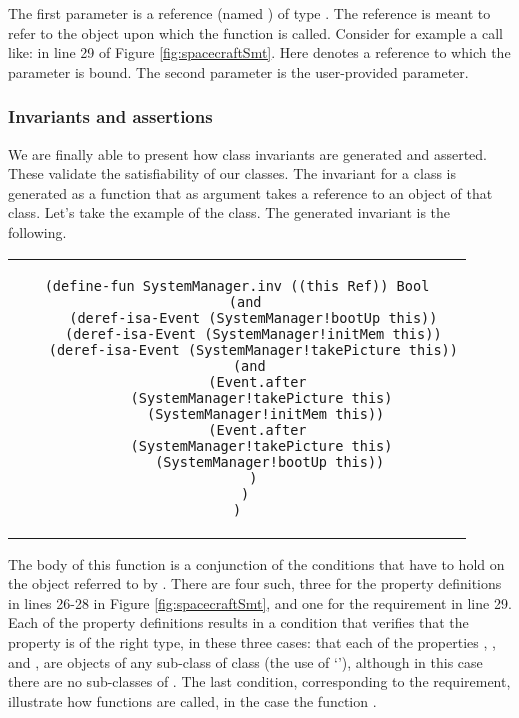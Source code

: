 The first parameter is a reference (named ) of type
. The  reference is meant to refer to the object
upon which the function is called. Consider for example a call like:
 in line 29 of Figure
\ref{fig:spacecraftSmt}. Here  denotes a reference
to which the parameter  is bound.  The second parameter is
the user-provided parameter.

\subsubsection{Invariants and assertions}

We are finally able to present how class invariants are generated and
asserted. These validate the satisfiability of our classes.  The
invariant for a class is generated as a function that as argument
takes a  reference to an object of that class. Let's take
the example of the  class. The generated invariant
is the following.

\begin{center}
\begin{tabular}{c}
\begin{lstlisting}
(define-fun SystemManager.inv ((this Ref)) Bool
  (and
    (deref-isa-Event (SystemManager!bootUp this))
    (deref-isa-Event (SystemManager!initMem this))
    (deref-isa-Event (SystemManager!takePicture this))
    (and 
      (Event.after 
        (SystemManager!takePicture this)  
        (SystemManager!initMem this)) 
      (Event.after 
        (SystemManager!takePicture this)  
        (SystemManager!bootUp this))
    )
  )
)
\end{lstlisting}
\end{tabular}
\end{center}

The body of this function is a conjunction of the conditions that have
to hold on the  object referred to by
. There are four such, three for the property definitions
in lines 26-28 in Figure \ref{fig:spacecraftSmt}, and one for the
requirement in line 29. Each of the property definitions results in a
condition that verifies that the property is of the right type, in
these three cases: that each of the properties , , 
and , are objects of any sub-class of class  (the use
of `'), although in this case there are no sub-classes of
. The last condition, corresponding to the requirement,
illustrate how functions are called, in the case the function
.


